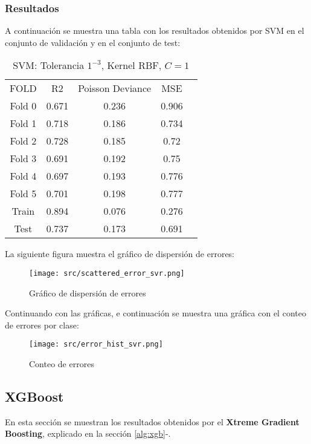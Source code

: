 \subsubsection*{Resultados}
A continuación se muestra una tabla con los resultados obtenidos por SVM en el conjunto de validación y en el conjunto de test:
\begin{table}[H]
	\centering
	\begin{tabular}{|c|c|c|c|c}
		\cline{1-4}
		FOLD   & R2    & Poisson Deviance & MSE   \\ \cline{1-4}
		Fold 0 & 0.671 & 0.236            & 0.906 \\ \cline{1-4}
		Fold 1 & 0.718 & 0.186            & 0.734 \\ \cline{1-4}
		Fold 2 & 0.728 & 0.185            & 0.72  \\ \cline{1-4}
		Fold 3 & 0.691 & 0.192            & 0.75  \\ \cline{1-4}
		Fold 4 & 0.697 & 0.193            & 0.776 \\ \cline{1-4}
		Fold 5 & 0.701 & 0.198            & 0.777 \\ \cline{1-4}
		Train  & 0.894 & 0.076            & 0.276 \\ \cline{1-4}
		Test   & 0.737 & 0.173            & 0.691 \\ \cline{1-4}
	\end{tabular}
	\caption{SVM: Tolerancia $1^{-3}$, Kernel RBF, $C=1$}
	\label{tab:svm_res}
\end{table}
La siguiente figura muestra el gráfico de dispersión de errores:
\begin{figure}[H]
	\centering
	\texttt{[image: src/scattered\_error\_svr.png]}
	\caption{Gráfico de dispersión de errores}
	\label{fig:svr_scattered}
\end{figure}
Continuando con las gráficas, e continuación se muestra una gráfica con el conteo de errores por clase:\\
\linebreak
\begin{figure}[H]
	\centering
	\texttt{[image: src/error\_hist\_svr.png]}
	\caption{Conteo de errores}
	\label{fig:svr_error_plot}
\end{figure}
\subsection{XGBoost}
En esta sección se muestran los resultados obtenidos por el \textbf{Xtreme Gradient Boosting}, explicado en la sección \ref{alg:xgb}-.
